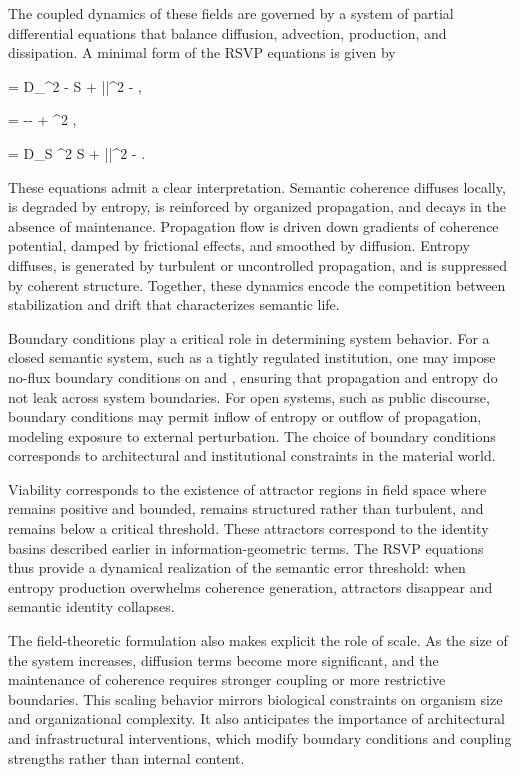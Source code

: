 \documentclass[11pt,oneside]{article}
\begin{document}
The coupled dynamics of these fields are governed by a system of partial differential equations that balance diffusion, advection, production, and dissipation. A minimal form of the RSVP equations is given by

 = D_\Phi \nabla^2 \Phi - \alpha S + \beta ||^2 - \gamma \Phi, 

 = -\nabla \Phi - \delta {} + \kappa \nabla^2 , 

 = D_S \nabla^2 S + \mu |\nabla {}|^2 - \nu \Phi. 

These equations admit a clear interpretation. Semantic coherence diffuses locally, is degraded by entropy, is reinforced by organized propagation, and decays in the absence of maintenance. Propagation flow is driven down gradients of coherence potential, damped by frictional effects, and smoothed by diffusion. Entropy diffuses, is generated by turbulent or uncontrolled propagation, and is suppressed by coherent structure. Together, these dynamics encode the competition between stabilization and drift that characterizes semantic life.

Boundary conditions play a critical role in determining system behavior. For a closed semantic system, such as a tightly regulated institution, one may impose no-flux boundary conditions on and , ensuring that propagation and entropy do not leak across system boundaries. For open systems, such as public discourse, boundary conditions may permit inflow of entropy or outflow of propagation, modeling exposure to external perturbation. The choice of boundary conditions corresponds to architectural and institutional constraints in the material world.

Viability corresponds to the existence of attractor regions in field space where remains positive and bounded, remains structured rather than turbulent, and remains below a critical threshold. These attractors correspond to the identity basins described earlier in information-geometric terms. The RSVP equations thus provide a dynamical realization of the semantic error threshold: when entropy production overwhelms coherence generation, attractors disappear and semantic identity collapses.

The field-theoretic formulation also makes explicit the role of scale. As the size of the system increases, diffusion terms become more significant, and the maintenance of coherence requires stronger coupling or more restrictive boundaries. This scaling behavior mirrors biological constraints on organism size and organizational complexity. It also anticipates the importance of architectural and infrastructural interventions, which modify boundary conditions and coupling strengths rather than internal content.
\end{document}

